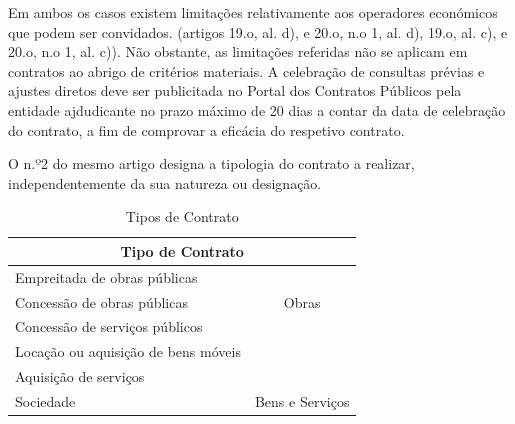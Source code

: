 Em ambos os casos existem limitações relativamente aos operadores económicos que podem ser convidados. (artigos 19.o, al. d), e 20.o, n.o 1, al. d), 19.o, al. c), e 20.o, n.o 1, al. c)). Não obstante, as limitações referidas não se aplicam em contratos ao abrigo de critérios materiais. 
A celebração de consultas prévias e ajustes diretos deve ser publicitada no Portal dos Contratos Públicos pela entidade ajdudicante no prazo máximo de 20 dias a contar da data de celebração do contrato, a fim de comprovar a eficácia do respetivo contrato. 






O n.º2 do mesmo artigo designa a tipologia do contrato a realizar, independentemente da sua natureza ou designação. 

\begin{table}[h!]
	\centering
	\renewcommand{\arraystretch}{1.15}
	\setlength{\tabcolsep}{15pt}
		\begin{tabular}{lc}
			\toprule
			\multicolumn{2}{c}{\textbf{Tipo de Contrato}}                                              \\ 
			\midrule
			Empreitada de obras públicas   &                                   \\
			Concessão de obras públicas                            & \multirow{-2}{*}{Obras}           \\ \hline
			Concessão de serviços públicos &                                   \\
			Locação ou aquisição de bens móveis                    &                                   \\
			Aquisição de serviços          &                                   \\
			Sociedade                                              & \multirow{-4}{*}{Bens e Serviços} \\ 
			\bottomrule
		\end{tabular}%
	\caption{Tipos de Contrato}
	\label{table:3}
\end{table}

